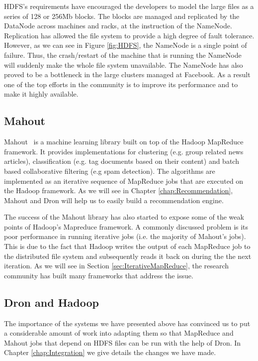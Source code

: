 \documentclass[11pt,a4paper,twoside]{report}
\begin{document}
HDFS's requirements have encouraged the developers to model the large files as a series of 128 or 256Mb blocks. The blocks are managed and replicated by the DataNode across machines and racks, at the instruction of the NameNode. Replication has allowed the file system to provide a high degree of fault tolerance. However, as we can see in Figure \ref{fig:HDFS}, the NameNode is a single point of failure. Thus, the crash/restart of the machine that is running the NameNode will suddenly make the whole file system unavailable. The NameNode has also proved to be a bottleneck in the large clusters managed at Facebook. As a result one of the top efforts in the community is to improve its performance and to make it highly available.

\subsection{Mahout}
\label{sec:Mahout}
Mahout~\cite{Mahout} is a machine learning library built on top of the Hadoop MapReduce framework. It provides implementations for clustering (e.g. group related news articles), classification (e.g. tag documents based on their content) and batch based collaborative filtering (e.g spam detection). The algorithms are implemented as an iterative sequence of MapReduce jobs that are executed on the Hadoop framework. As we will see in Chapter \ref{chap:Recommendation}, Mahout and Dron will help us to easily build a recommendation engine.


The success of the Mahout library has also started to expose some of the weak points of Hadoop's Mapreduce framework. A commonly discussed problem is its poor performance in running iterative jobs (i.e. the majority of Mahout's jobs). This is due to the fact that Hadoop writes the output of each MapReduce job to the distributed file system and subsequently reads it back on  during the the next iteration. As we will see in Section \ref{sec:IterativeMapReduce}, the research community has built many frameworks that address the issue.

\subsection{Dron and Hadoop}
The importance of the systems we have presented above has convinced us to put a considerable amount of work into adapting them so that MapReduce and Mahout jobs that depend on HDFS files can be run with the help of Dron. In Chapter \ref{chap:Integration} we give details the changes we have made.
\end{document}
